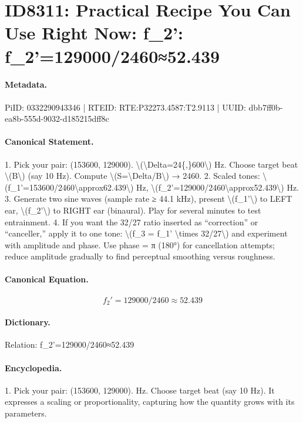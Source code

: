 \section*{ID8311: Practical Recipe You Can Use Right Now: f\_2': f\_2'=129000/2460≈52.439}
\paragraph{Metadata.}
PiID: 0332290943346 | RTEID: RTE:P32273.4587:T2.9113 | UUID: dbb7ff0b-ea8b-555d-9032-d185215dff8c

\paragraph{Canonical Statement.}
1. Pick your pair: (153600, 129000). \textbackslash{}(\textbackslash{}Delta=24\{,\}600\textbackslash{}) Hz. Choose target beat \textbackslash{}(B\textbackslash{}) (say 10 Hz). Compute \textbackslash{}(S=\textbackslash{}Delta/B\textbackslash{}) → 2460. 2. Scaled tones: \textbackslash{}(f\_1'=153600/2460\textbackslash{}approx62.439\textbackslash{}) Hz, \textbackslash{}(f\_2'=129000/2460\textbackslash{}approx52.439\textbackslash{}) Hz. 3. Generate two sine waves (sample rate ≥ 44.1 kHz), present \textbackslash{}(f\_1'\textbackslash{}) to LEFT ear, \textbackslash{}(f\_2'\textbackslash{}) to RIGHT ear (binaural). Play for several minutes to test entrainment. 4. If you want the 32/27 ratio inserted as “correction” or “canceller,” apply it to one tone: \textbackslash{}(f\_3 = f\_1' \textbackslash{}times 32/27\textbackslash{}) and experiment with amplitude and phase. Use phase = π (180°) for cancellation attempts; reduce amplitude gradually to find perceptual smoothing versus roughness.

\paragraph{Canonical Equation.}
\[
f_2'=129000/2460\approx52.439
\]

\paragraph{Dictionary.}
Relation: f\_2'=129000/2460≈52.439

\paragraph{Encyclopedia.}
1. Pick your pair: (153600, 129000). Hz. Choose target beat (say 10 Hz). It expresses a scaling or proportionality, capturing how the quantity grows with its parameters.
